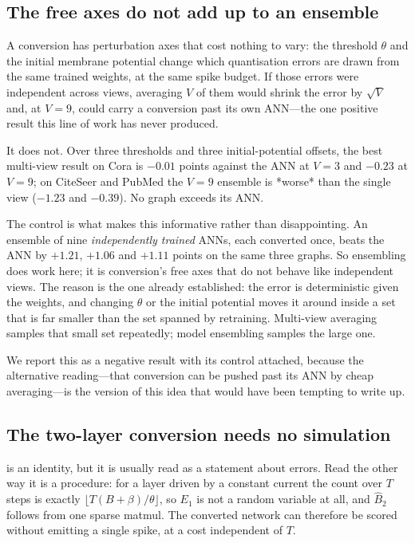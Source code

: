 \subsection{The free axes do not add up to an ensemble}
\label{sec:ensemble}

A conversion has perturbation axes that cost nothing to vary: the threshold $\theta$ and the initial
membrane potential change which quantisation errors are drawn from the same trained weights, at the
same spike budget. If those errors were independent across views, averaging $V$ of them would shrink
the error by $\sqrt{V}$ and, at $V=9$, could carry a conversion past its own ANN---the one positive
result this line of work has never produced.

It does not. Over three thresholds and three initial-potential offsets, the best multi-view result on
Cora is $-0.01$ points against the ANN at $V=3$ and $-0.23$ at $V=9$; on CiteSeer and PubMed the
$V=9$ ensemble is *worse* than the single view ($-1.23$ and $-0.39$). No graph exceeds its ANN.

The control is what makes this informative rather than disappointing. An ensemble of nine
\emph{independently trained} ANNs, each converted once, beats the ANN by $+1.21$, $+1.06$ and $+1.11$
points on the same three graphs. So ensembling does work here; it is conversion's free axes that do
not behave like independent views. The reason is the one  already established: the
error is deterministic given the weights, and changing $\theta$ or the initial potential moves it
around inside a set that is far smaller than the set spanned by retraining. Multi-view averaging
samples that small set repeatedly; model ensembling samples the large one.

We report this as a negative result with its control attached, because the alternative reading---that
conversion can be pushed past its ANN by cheap averaging---is the version of this idea that would
have been tempting to write up.

\subsection{The two-layer conversion needs no simulation}
\label{sec:closed}

 is an identity, but it is usually read as a statement about errors. Read the
other way it is a procedure: for a layer driven by a constant current the count over $T$ steps is
exactly $\lfloor T(B+\beta)/\theta\rfloor$, so $E_{1}$ is not a random variable at all, and
$\hat{B}_{2}$ follows from one sparse matmul. The converted network can therefore be scored without
emitting a single spike, at a cost independent of $T$.

